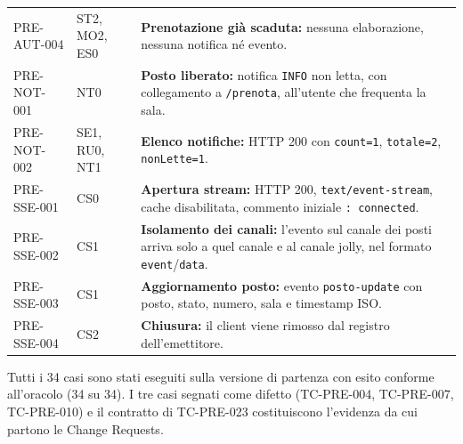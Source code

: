 \documentclass[11pt,a4paper,oneside,openany]{book}
\begin{document}
{\begin{xltabular}{\linewidth}{L{2.4cm}L{3.4cm}Y}
  PRE-AUT-004 & ST2, MO2, ES0 &
  \textbf{Prenotazione già scaduta:} nessuna elaborazione, nessuna notifica
  né evento. \\
  PRE-NOT-001 & NT0 &
  \textbf{Posto liberato:} notifica \texttt{INFO} non letta, con collegamento
  a \texttt{/prenota}, all'utente che frequenta la sala. \\
  PRE-NOT-002 & SE1, RU0, NT1 &
  \textbf{Elenco notifiche:} HTTP 200 con \texttt{count=1},
  \texttt{totale=2}, \texttt{nonLette=1}. \\
  PRE-SSE-001 & CS0 &
  \textbf{Apertura stream:} HTTP 200, \texttt{text/event-stream}, cache
  disabilitata, commento iniziale \texttt{: connected}. \\
  PRE-SSE-002 & CS1 &
  \textbf{Isolamento dei canali:} l'evento sul canale dei posti arriva solo
  a quel canale e al canale jolly, nel formato \texttt{event}/\texttt{data}. \\
  PRE-SSE-003 & CS1 &
  \textbf{Aggiornamento posto:} evento \texttt{posto-update} con posto,
  stato, numero, sala e timestamp ISO. \\
  PRE-SSE-004 & CS2 &
  \textbf{Chiusura:} il client viene rimosso dal registro dell'emettitore. \\
  \bottomrule
\end{xltabular}}

Tutti i 34 casi sono stati eseguiti sulla versione di partenza con esito
conforme all'oracolo (34 su 34). I tre casi segnati come difetto (TC-PRE-004,
TC-PRE-007, TC-PRE-010) e il contratto di TC-PRE-023 costituiscono l'evidenza
da cui partono le Change Requests.
\end{document}
